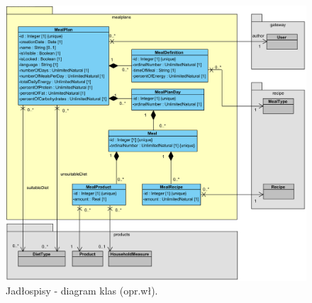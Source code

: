 \begin{minipage}{\textwidth}
    \begin{figure}[H]
        \centering\includegraphics[scale=0.7]{../uml/class_diagrams/mealplans.png}
        \caption{Jadłospisy - diagram klas (opr.wł).}\label{rysunek:class-diagram-mealplans}
    \end{figure}
\end{minipage}

